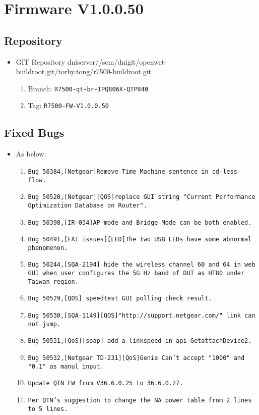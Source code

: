 \documentclass[12pt]{report}
\newcommand{\tlabel}[1]{
  \label{#1}%
  }
\begin{document}
\section{Firmware V1.0.0.50}

\tlabel{sec:1-0-1}
\subsection{Repository}
\begin{itemize}
	\item GIT Repository dniserver//scm/dnigit/openwrt-buildroot.git/torby.tong/r7500-buildroot.git
	\begin{enumerate}
		\item Branch: \texttt{R7500-qt-br-IPQ806X-QTP840}
                \item Tag: \texttt{R7500-FW-V1.0.0.50}
	\end{enumerate}
\end{itemize}

    \subsection{Fixed Bugs}
    \begin{itemize}
    \item As below:
    	\begin{enumerate}
		\item \texttt{Bug 50384,[Netgear]Remove Time Machine sentence in cd-less flow.}
		\item \texttt{Bug 50520,[Netgear][QOS]replace GUI string "Current Performance Optimization Database on Router".}
		\item \texttt{Bug 50398,[IR-034]AP mode and Bridge Mode can be both enabled.}
		\item \texttt{Bug 50491,[FAI issues][LED]The two USB LEDs have some abnormal phenomenon.}
		\item \texttt{Bug 50244,[SQA-2194] hide the wireless channel 60 and 64 in web GUI when user configures the 5G Hz band of DUT as HT80 under Taiwan region.}
		\item \texttt{Bug 50529,[QOS] speedtest GUI polling check result.}
		\item \texttt{Bug 50530,[SQA-1149][QOS]"http://support.netgear.com/" link can not jump.}
		\item \texttt{Bug 50531,[QoS][soap] add a linkspeed in api GetattachDevice2.}
		\item \texttt{Bug 50532,[Netgear TD-231][QoS]Genie Can't accept "1000" and "0.1" as manul input.}
		\item \texttt{Update QTN FW from V36.6.0.25 to 36.6.0.27.}
		\item \texttt{Per QTN's suggestion to change the NA power table from 2 lines to 5 lines.}

    	\end{enumerate}
    \end{itemize}
\end{document}
